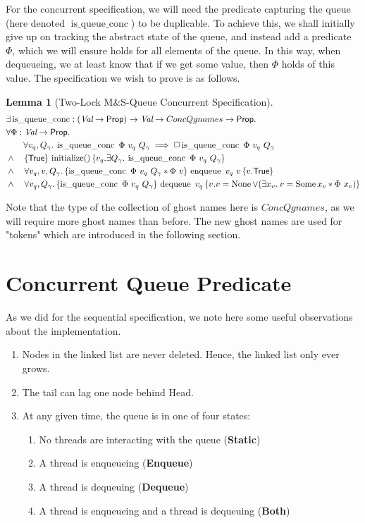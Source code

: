 \documentclass[a4paper, 11pt]{report}
\newtheorem{lemma}[theorem]{Lemma}
\newcommand{\initialise}{\operatorname{initialize}}
\newcommand{\enqueue}{\operatorname{enqueue}}
\newcommand{\dequeue}{\operatorname{dequeue}}
\newcommand{\tlmsq}{Two-Lock M\&S-Queue\xspace}
\newcommand{\isqueueconc}{\operatorname{is\_queue\_conc}}
\newcommand{\ConcQgnames}{ConcQgnames}
\newcommand{\StaticState}{\textbf{Static}}
\newcommand{\EnqueueState}{\textbf{Enqueue}}
\newcommand{\DequeueState}{\textbf{Dequeue}}
\newcommand{\BothState}{\textbf{Both}}
\newcommand{\tlconcspecinit}{\hoare{\TRUE}{\initialise \TT}{v_q . \Exists Q_\gname. \isqueueconc\ \Phi \ v_q \ Q_\gname}}
\newcommand{\tlconcspecenq}{\All v_q, v, Q_\gname. \hoare{\isqueueconc \ \Phi \ v_q \ Q_\gname \star \Phi \ v}{\enqueue\ v_q\ v}{v . \TRUE}}
\newcommand{\tlconcspecdeq}{\All v_q, Q_\gname. \hoare{\isqueueconc \ \Phi \ v_q \ Q_\gname}{\dequeue\ v_q}{v . v = \None \lor (\Exists x_v. v = \Some x_v \star \Phi \ x_v)}}
\begin{document}
For the concurrent specification, we will need the predicate capturing the queue (here denoted $\isqueueconc$) to be duplicable. To achieve this, we shall initially give up on tracking the abstract state of the queue, and instead add a predicate $\Phi$, which we will ensure holds for all elements of the queue. In this way, when dequeueing, we at least know that if we get some value, then $\Phi$ holds of this value. The specification we wish to prove is as follows.
\begin{lemma}[\tlmsq Concurrent Specification]\label{TLMSQ:spec:conc}
\begin{align*}
  &\Exists \isqueueconc : (\Val \to \Prop) \to \Val \to \ConcQgnames \to \Prop.\\
  &\All \Phi : \Val \to \Prop.\\
  &\quad\quad \All v_q, Q_\gname . \isqueueconc \ \Phi \ v_q \ Q_\gname \implies \persistently \isqueueconc \ \Phi \ v_q \ Q_\gname\\
  &\land\quad\tlconcspecinit\\
  &\land\quad\tlconcspecenq\\
  &\land\quad\tlconcspecdeq
\end{align*}
\end{lemma}
Note that the type of the collection of ghost names here is $\ConcQgnames$, as we will require more ghost names than before. The new ghost names are used for "tokens" which are introduced in the following section.

\section{Concurrent Queue Predicate}
\label{TLMSQCONC:section:conc-queue-pred}

As we did for the sequential specification, we note here some useful observations about the implementation.
\begin{enumerate}
  \item\label{TLMSQ:insights:oldnodes} Nodes in the linked list are never deleted. Hence, the linked list only ever grows.
  \item\label{TLMSQ:insights:lag} The tail can lag one node behind Head.
  \item\label{TLMSQ:insights:states} At any given time, the queue is in one of four states:
    \begin{enumerate}
      \item\label{TLMSQ:insights:state:static} No threads are interacting with the queue (\StaticState)
      \item\label{TLMSQ:insights:state:enqueue} A thread is enqueueing (\EnqueueState)
      \item\label{TLMSQ:insights:state:dequeue} A thread is dequeuing (\DequeueState)
      \item\label{TLMSQ:insights:state:both} A thread is enqueueing and a thread is dequeuing (\BothState)
    \end{enumerate}
\end{enumerate}
\end{document}
